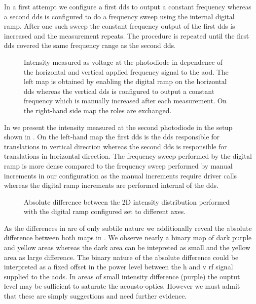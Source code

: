 In a first attempt we configure a first \gls{dds} to output a constant
frequency whereas a second \gls{dds} is configured to do a frequency sweep
using the internal digital ramp. After one such sweep the constant frequency
output of the first \gls{dds} is increased and the measurement repeats. The
procedure is repeated until the first \gls{dds} covered the same frequency
range as the second \gls{dds}.
\begin{figure}[htb]
  \centering
  \begin{adjustbox}{width=\textwidth}
  \end{adjustbox}
  \caption{Intensity measured as voltage at the photodiode in dependence of
    the horizontal and vertical applied frequency signal to the \gls{aod}. The
    left map is obtained by enabling the digital ramp on the horizontal
    \gls{dds} whereas the vertical \gls{dds} is configured to output a
    constant frequency which is manually increased after each measurement.
    On the right-hand side map the roles are exchanged.
  }\label{fig:intensity_distribution_frequency}
\end{figure}
In  we present the intensity
measured at the second photodiode in the setup shown in
. On the left-hand map the first
\gls{dds} is the \gls{dds} responsible for translations in vertical direction
whereas the second \gls{dds} is responsible for translations in horizontal
direction. The frequency sweep performed by the digital ramp is more dense
compared to the frequency sweep performed by manual increments in our
configuration as the manual increments require driver calls whereas the
digital ramp increments are performed internal of the \gls{dds}.
\begin{figure}[htb]
  \centering
  \begin{adjustbox}{width=\textwidth}
  \end{adjustbox}
  \caption{Absolute difference between the 2D intensity distribution
    performed with the digital ramp configured set to different axes.
  }\label{fig:intensity_distribution_frequency_residue}
\end{figure}
As the differences in  are of only
subtile nature we additionally reveal the absolute difference between both
maps in . We observe
nearly a binary map of dark purple and yellow areas whereas the dark area can
be intepreted as small and the yellow area as large difference. The binary
nature of the absolute difference could be interpreted as a fixed offset
in the power level between the \gls{h} and \gls{v} \gls{rf} signal supplied to
the \gls{aod}s. In areas of small intensity difference (purple) the ouptut
level may be sufficient to saturate the acousto-optics. However we must admit
that these are simply suggestions and need further evidence.

